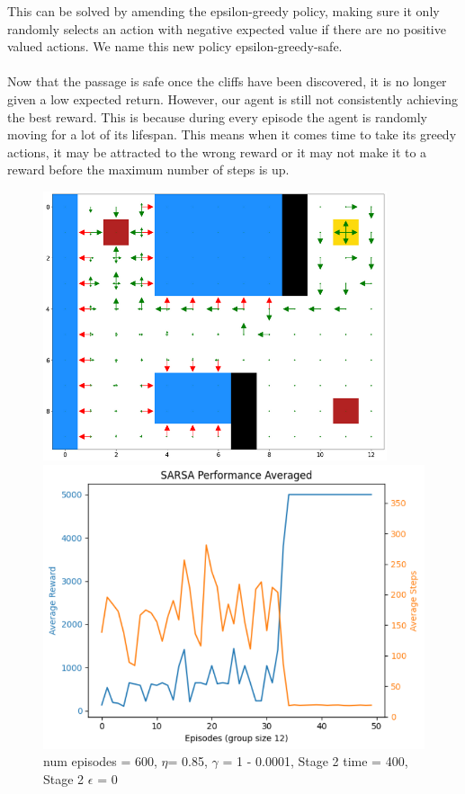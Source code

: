 \documentclass[12pt]{article}
\begin{document}
This can be solved by amending the epsilon-greedy policy, making sure it only randomly selects an action with negative expected value if there are no positive valued actions. We name this new policy epsilon-greedy-safe. 
\\ \\
Now that the passage is safe once the cliffs have been discovered, it is no longer given a low expected return. However, our agent is still not consistently achieving the best reward. This is because during every episode the agent is randomly moving for a lot of its lifespan. This means when it comes time to take its greedy actions, it may be attracted to the wrong reward or it may not make it to a reward before the maximum number of steps is up. 

\begin{figure}
  \centering
\begin{minipage}{.28\textwidth}
  \includegraphics[width=0.9\textwidth]{10 Q plot.png}
  \caption{  num episodes = 600, $\eta$= 0.85, $\gamma$ = 1 - 0.0001, Stage 2 time = 400, Stage 2 $\epsilon$  =  0}
\end{minipage}%
\begin{minipage}{.32\textwidth}
  \centering
  \includegraphics[width=1\textwidth]{10 performance plot.png}
\end{minipage}
\end{figure}
\end{document}
